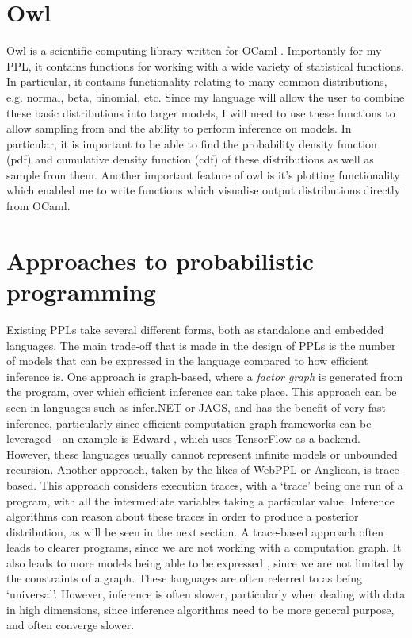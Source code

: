 \section{Owl}
	
Owl is a scientific computing library written for OCaml \cite{owl}. Importantly for my PPL, it contains functions for working with a wide variety of statistical functions. In particular, it contains functionality relating to many common distributions, e.g. normal, beta, binomial, etc. Since my language will allow the user to combine these basic distributions into larger models, I will need to use these functions to allow sampling from and the ability to perform inference on models. In particular, it is important to be able to find the probability density function (pdf) and cumulative density function (cdf) of these distributions as well as sample from them. Another important feature of owl is it's plotting functionality which enabled me to write functions which visualise output distributions directly from OCaml.

\section{Approaches to probabilistic programming}
Existing PPLs take several different forms, both as standalone and embedded languages. The main trade-off that is made in the design of PPLs is the number of models that can be expressed in the language compared to how efficient inference is. One approach is graph-based, where a \textit{factor graph} is generated from the program, over which efficient inference can take place. This approach can be seen in languages such as infer.NET or JAGS, and has the benefit of very fast inference, particularly since efficient computation graph frameworks can be leveraged - an example is Edward \cite{edward}, which uses TensorFlow as a backend. However, these languages usually cannot represent infinite models or unbounded recursion. Another approach, taken by the likes of WebPPL or Anglican, is trace-based. This approach considers execution traces, with a `trace' being one run of a program, with all the intermediate variables taking a particular value. Inference algorithms can reason about these traces in order to produce a posterior distribution, as will be seen in the next section. A trace-based approach often leads to clearer programs, since we are not working with a computation graph. It also leads to more models being able to be expressed , since we are not limited by the constraints of a graph. These languages are often referred to as being `universal'. However, inference is often slower, particularly when dealing with data in high dimensions, since inference algorithms need to be more general purpose, and often converge slower.
	

